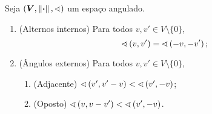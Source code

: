 \begin{exercise}
Seja $(\bm V, \left\Vert{\bm{\cdot}}\right\Vert,\sphericalangle)$ um espaço angulado.
	\begin{enumerate}
	\item (Alternos internos) Para todos $v,v' \in V \setminus \{0\}$,
			\begin{equation*}
			\sphericalangle\left({v},{v'}\right) = \sphericalangle\left({-v},{-v'}\right);
			\end{equation*}

	\item (Ângulos externos) Para todos $v,v' \in V \setminus \{0\}$,
			\begin{enumerate}
			\item (Adjacente) $\sphericalangle\left({v'},{v'-v}\right) < \sphericalangle\left({v'},{-v}\right)$;
			\item (Oposto) $\sphericalangle\left({v},{v-v'}\right) < \sphericalangle\left({v'},{-v}\right)$.
			\end{enumerate}
	\end{enumerate}
\end{exercise}

